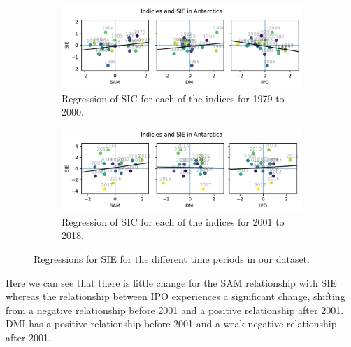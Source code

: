 \begin{figure}[H]
    \begin{subfigure}{\linewidth}
    \centering
    \includegraphics[width=\linewidth]{Images_3.0/regressions/scatter_anomalous_n1_annually_detrended_1979_2000.pdf}
    \caption{Regression of SIC for each of the indices for 1979 to 2000.}
    \label{fig:scatter_anomalous_n1_annually_1979_2000}
    \end{subfigure}
    
    \begin{subfigure}{\linewidth}
    \centering
    \includegraphics[width=\linewidth]{Images_3.0/regressions/scatter_anomalous_n1_annually_detrended_2001_2018.pdf}
    \caption{Regression of SIC for each of the indices for 2001 to 2018.}
    \label{fig:scatter_anomalous_n1_annually_2001_2018}
    \end{subfigure}
    \caption{Regressions for SIE for the different time periods in our dataset.}
\end{figure}
Here we can see that there is little change for the SAM relationship with SIE whereas the relationship between IPO experiences a significant change, shifting from a negative relationship before 2001 and a positive relationship after 2001. DMI has a positive relationship before 2001 and a weak negative relationship after 2001.

